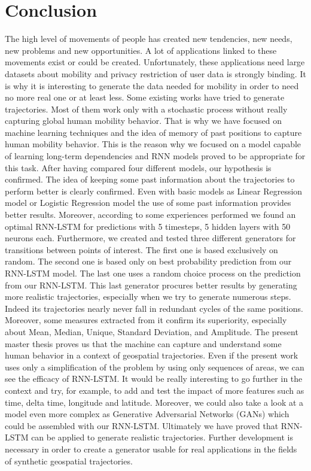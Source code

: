 \documentclass[a4]{article}
\begin{document}
\section{Conclusion}%
The high level of movements of people has created new tendencies, new needs, new problems and new opportunities. A lot of applications linked to these movements exist or could be created. Unfortunately, these applications need large datasets about mobility and privacy restriction of user data is strongly binding. It is why it is interesting to generate the data needed for mobility in order to need no more real one or at least less. Some existing works have tried to generate trajectories. Most of them work only with a stochastic process without really capturing global human mobility behavior. That is why we have focused on machine learning techniques and the idea of memory of past positions to capture human mobility behavior. This is the reason why we focused on a model capable of learning long-term dependencies and RNN models proved to be appropriate for this task.
After having compared four different models, our hypothesis is confirmed. The idea of keeping some past information about the trajectories to perform better is clearly confirmed. Even with basic models as Linear Regression model or Logistic Regression model the use of some past information provides better results. Moreover, according to some experiences performed we found an optimal RNN-LSTM for predictions with 5 timesteps, 5 hidden layers with 50 neurons each. Furthermore, we created and tested three different generators for transitions between points of interest. The first one is based exclusively on random. The second one is based only on best probability prediction from our RNN-LSTM model. The last one uses a random choice process on the prediction from our RNN-LSTM. This last generator procures better results by generating more realistic trajectories, especially when we try to generate numerous steps. Indeed its trajectories nearly never fall in redundant cycles of the same positions. Moreover, some measures extracted from it confirm its superiority, especially about  Mean, Median, Unique, Standard Deviation, and Amplitude.
The present master thesis proves us that the machine can capture and understand some human behavior in a context of geospatial trajectories. Even if the present work uses only a simplification of the problem by using only sequences of areas, we can see the efficacy of RNN-LSTM. It would be really interesting to go further in the context and try, for example, to add and test the impact of more features such as time, delta time, longitude and latitude. Moreover, we could also take a look at a model even more complex as Generative Adversarial Networks (GANs) which could be assembled with our RNN-LSTM. Ultimately we have proved that RNN-LSTM can be applied to generate realistic trajectories. Further development is necessary in order to create a generator usable for real applications in the fields of synthetic geospatial trajectories.
\end{document}
